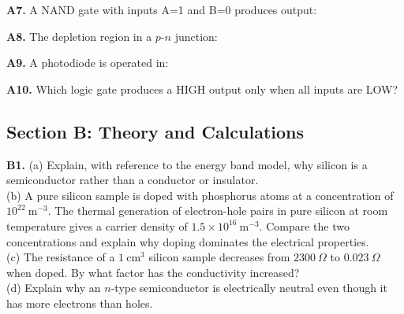 \begin{exercisebox}[29]
\vspace{0.4cm}

\textbf{A7.} A NAND gate with inputs A=1 and B=0
produces output:


\vspace{0.4cm}

\textbf{A8.} The depletion region in a $p$-$n$
junction:


\vspace{0.4cm}

\textbf{A9.} A photodiode is operated in:


\vspace{0.4cm}

\textbf{A10.} Which logic gate produces a HIGH
output only when all inputs are LOW?


\vspace{0.6cm}

\subsection*{Section B: Theory and Calculations}

\textbf{B1.} (a) Explain, with reference to the
energy band model, why silicon is a semiconductor
rather than a conductor or insulator.\\[4pt]
(b) A pure silicon sample is doped with phosphorus
atoms at a concentration of $10^{22}\ \text{m}^{-3}$.
The thermal generation of electron-hole pairs in
pure silicon at room temperature gives a carrier
density of $1.5\times10^{16}\ \text{m}^{-3}$.
Compare the two concentrations and explain why
doping dominates the electrical properties.\\[4pt]
(c) The resistance of a $1\ \text{cm}^3$ silicon
sample decreases from $2300\ \Omega$ to
$0.023\ \Omega$ when doped. By what factor has the
conductivity increased?\\[4pt]
(d) Explain why an $n$-type semiconductor is
electrically neutral even though it has more
electrons than holes.
\hfill{}


\end{exercisebox}

